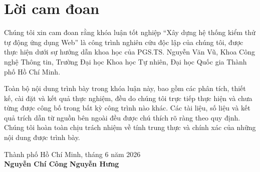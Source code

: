\chapter*{Lời cam đoan}
\label{commitment}

Chúng tôi xin cam đoan rằng khóa luận tốt nghiệp ``Xây dựng hệ thống kiểm thử tự động ứng dụng Web'' là công trình nghiên cứu độc lập của chúng tôi, được thực hiện dưới sự hướng dẫn khoa học của PGS.TS. Nguyễn Văn Vũ, Khoa Công nghệ Thông tin, Trường Đại học Khoa học Tự nhiên, Đại học Quốc gia Thành phố Hồ Chí Minh.

Toàn bộ nội dung trình bày trong khóa luận này, bao gồm các phân tích, thiết kế, cài đặt và kết quả thực nghiệm, đều do chúng tôi trực tiếp thực hiện và chưa từng được công bố trong bất kỳ công trình nào khác. Các tài liệu, số liệu và kết quả trích dẫn từ nguồn bên ngoài đều được chú thích rõ ràng theo quy định. Chúng tôi hoàn toàn chịu trách nhiệm về tính trung thực và chính xác của những nội dung được trình bày.

\vspace{2cm}

\begin{flushright}
Thành phố Hồ Chí Minh, tháng 6 năm 2026 \\[0.5cm]
\textbf{Nguyễn Chí Công} \hspace{2cm} \textbf{Nguyễn Hưng}
\end{flushright}
